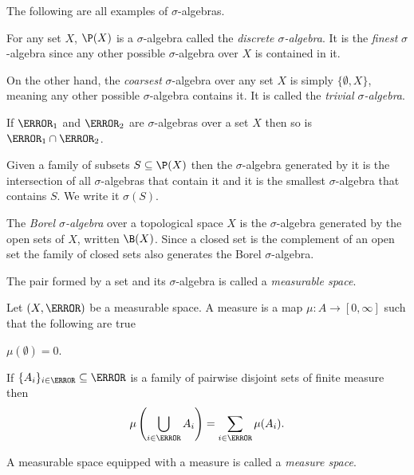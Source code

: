 \documentclass[12pt,oneside]{book}
\begin{document}
\begin{example}
	The following are all examples of \( \sigma \)-algebras.
	\begin{points}
	\item For any set \( X \), \( \P(X) \) is a \( \sigma \)-algebra called the \emph{discrete \( \sigma \)-algebra}. It is the \emph{finest} \( \sigma \)-algebra since any other possible \( \sigma \)-algebra over \( X \) is contained in it.
	\item On the other hand, the \emph{coarsest} \( \sigma \)-algebra over any set \( X \) is simply \( \{ \emptyset, X \} \), meaning any other possible \( \sigma \)-algebra contains it. It is called the \emph{trivial \( \sigma \)-algebra}.
	\item If \( \A_1 \) and \( \A_2 \) are \( \sigma \)-algebras over a set \( X \) then so is \( \A_1 \cap \A_2 \).
	\item Given a family of subsets \( S \subseteq \P(X) \) then the \( \sigma \)-algebra generated by it is the intersection of all \( \sigma \)-algebras that contain it and it is the smallest \( \sigma \)-algebra that contains \( S \). We write it \( \sigma(S) \).
	\item The \emph{Borel \( \sigma \)-algebra} over a topological space \( X \) is the \( \sigma \)-algebra generated by the open sets of \( X \), written \( \B(X) \). Since a closed set is the complement of an open set the family of closed sets also generates the Borel \( \sigma \)-algebra.
	\end{points}
\end{example}
The pair formed by a set and its \( \sigma \)-algebra is called a \emph{measurable space}.

\begin{definition}[Measure]
	Let \( (X,\A) \) be a measurable space. A measure is a map \( \mu \colon A \to [0,\infty] \) such that the following are true
	\begin{points}
	\item \( \mu(\emptyset) = 0 \).
	\item If \( \{ A_i \}_{i \in \N} \subseteq \A \) is a family of pairwise disjoint sets of finite measure then
		\begin{equation*}
			\mu\left(\bigcup_{i \in \N} A_i\right) = \sum_{i \in \N} \mu(A_i). 
		\end{equation*}
	\end{points}
\end{definition}
A measurable space equipped with a measure is called a \emph{measure space}.
\end{document}

